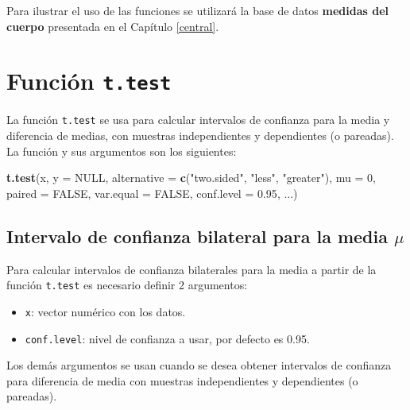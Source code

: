 \documentclass[10pt,]{krantz}
\makeatletter
\newenvironment{Shaded}{\begin{snugshade}}{\end{snugshade}}
\newcommand{\KeywordTok}[1]{\textcolor[rgb]{0.13,0.29,0.53}{\textbf{{#1}}}}
\newcommand{\DataTypeTok}[1]{\textcolor[rgb]{0.13,0.29,0.53}{{#1}}}
\newcommand{\DecValTok}[1]{\textcolor[rgb]{0.00,0.00,0.81}{{#1}}}
\newcommand{\FloatTok}[1]{\textcolor[rgb]{0.00,0.00,0.81}{{#1}}}
\newcommand{\StringTok}[1]{\textcolor[rgb]{0.31,0.60,0.02}{{#1}}}
\newcommand{\OtherTok}[1]{\textcolor[rgb]{0.56,0.35,0.01}{{#1}}}
\newcommand{\NormalTok}[1]{{#1}}
\providecommand{\tightlist}{%
  \setlength{\itemsep}{0pt}\setlength{\parskip}{0pt}}
\newenvironment{kframe}{%
\medskip{}
\setlength{\fboxsep}{.8em}
 \def\at@end@of@kframe{}%
 \ifinner\ifhmode%
  \def\at@end@of@kframe{\end{minipage}}%
  \begin{minipage}{\columnwidth}%
 \fi\fi%
 \def\FrameCommand##1{\hskip\@totalleftmargin \hskip-\fboxsep
 \colorbox{shadecolor}{##1}\hskip-\fboxsep
     \hskip-\linewidth \hskip-\@totalleftmargin \hskip\columnwidth}%
 \MakeFramed {\advance\hsize-\width
   \@totalleftmargin\z@ \linewidth\hsize
   \@setminipage}}%
 {\par\unskip\endMakeFramed%
 \at@end@of@kframe}
\renewenvironment{Shaded}{\begin{kframe}}{\end{kframe}}
\makeatother
\begin{document}
Para ilustrar el uso de las funciones se utilizará la base de datos
\textbf{medidas del cuerpo} presentada en el Capítulo \ref{central}.

\section{\texorpdfstring{Función
\texttt{t.test}}{Función t.test}}\label{funcion-t.test}

La función \texttt{t.test} se usa para calcular intervalos de confianza
para la media y diferencia de medias, con muestras independientes y
dependientes (o pareadas). La función y sus argumentos son los
siguientes:

\begin{Shaded}
\begin{Highlighting}[]
\KeywordTok{t.test}\NormalTok{(x, }\DataTypeTok{y =} \OtherTok{NULL}\NormalTok{,}
       \DataTypeTok{alternative =} \KeywordTok{c}\NormalTok{(}\StringTok{"two.sided"}\NormalTok{, }\StringTok{"less"}\NormalTok{, }\StringTok{"greater"}\NormalTok{),}
       \DataTypeTok{mu =} \DecValTok{0}\NormalTok{, }\DataTypeTok{paired =} \OtherTok{FALSE}\NormalTok{, }\DataTypeTok{var.equal =} \OtherTok{FALSE}\NormalTok{,}
       \DataTypeTok{conf.level =} \FloatTok{0.95}\NormalTok{, ...)}
\end{Highlighting}
\end{Shaded}

\subsection{\texorpdfstring{Intervalo de confianza bilateral para la
media
\(\mu\)}{Intervalo de confianza bilateral para la media \textbackslash{}mu}}\label{intervalo-de-confianza-bilateral-para-la-media-mu}

Para calcular intervalos de confianza bilaterales para la media a partir
de la función \texttt{t.test} es necesario definir 2 argumentos:

\begin{itemize}
\tightlist
\item
  \texttt{x}: vector numérico con los datos.
\item
  \texttt{conf.level}: nivel de confianza a usar, por defecto es 0.95.
\end{itemize}

Los demás argumentos se usan cuando se desea obtener intervalos de
confianza para diferencia de media con muestras independientes y
dependientes (o pareadas).
\end{document}

